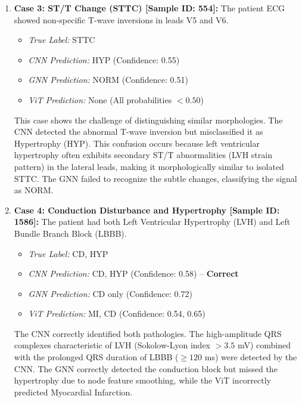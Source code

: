 \documentclass[12pt,a4paper]{report}
\begin{document}
\begin{enumerate}
    \item \textbf{Case 3: ST/T Change (STTC) [Sample ID: 554]:}
    The patient ECG showed non-specific T-wave inversions in leads V5 and V6.
    \begin{itemize}
        \item \emph{True Label:} STTC
        \item \emph{CNN Prediction:} HYP (Confidence: 0.55)
        \item \emph{GNN Prediction:} NORM (Confidence: 0.51)
        \item \emph{ViT Prediction:} None (All probabilities $< 0.50$)
    \end{itemize}
    This case shows the challenge of distinguishing similar morphologies. The CNN detected the abnormal T-wave inversion but misclassified it as Hypertrophy (HYP). This confusion occurs because left ventricular hypertrophy often exhibits secondary ST/T abnormalities (LVH strain pattern) in the lateral leads, making it morphologically similar to isolated STTC. The GNN failed to recognize the subtle changes, classifying the signal as NORM.
    
    \item \textbf{Case 4: Conduction Disturbance and Hypertrophy [Sample ID: 1586]:}
    The patient had both Left Ventricular Hypertrophy (LVH) and Left Bundle Branch Block (LBBB).
    \begin{itemize}
        \item \emph{True Label:} CD, HYP
        \item \emph{CNN Prediction:} CD, HYP (Confidence: 0.58) -- \textbf{Correct}
        \item \emph{GNN Prediction:} CD only (Confidence: 0.72)
        \item \emph{ViT Prediction:} MI, CD (Confidence: 0.54, 0.65)
    \end{itemize}
    The CNN correctly identified both pathologies. The high-amplitude QRS complexes characteristic of LVH (Sokolow-Lyon index $>3.5$ mV) combined with the prolonged QRS duration of LBBB ($\ge 120$ ms) were detected by the CNN. The GNN correctly detected the conduction block but missed the hypertrophy due to node feature smoothing, while the ViT incorrectly predicted Myocardial Infarction.
\end{enumerate}
\end{document}
